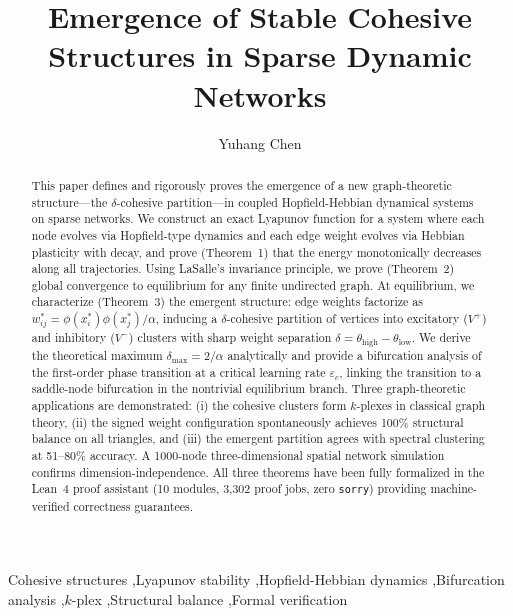 \documentclass[3p]{elsarticle}
\begin{document}
\begin{frontmatter}
\title{Emergence of Stable Cohesive Structures in Sparse Dynamic Networks}
\author[1]{Yuhang Chen}
\address[1]{Independent Researcher, Zhejiang, China}
\begin{abstract}

This paper defines and rigorously proves the emergence of a new graph-theoretic structure---the $\delta$-cohesive partition---in coupled Hopfield-Hebbian dynamical systems on sparse networks. We construct an exact Lyapunov function for a system where each node evolves via Hopfield-type dynamics and each edge weight evolves via Hebbian plasticity with decay, and prove (Theorem~1) that the energy monotonically decreases along all trajectories. Using LaSalle's invariance principle, we prove (Theorem~2) global convergence to equilibrium for any finite undirected graph. At equilibrium, we characterize (Theorem~3) the emergent structure: edge weights factorize as $w_{ij}^* = \phi(x_i^*)\phi(x_j^*)/\alpha$, inducing a $\delta$-cohesive partition of vertices into excitatory ($V^+$) and inhibitory ($V^-$) clusters with sharp weight separation $\delta = \theta_{\text{high}} - \theta_{\text{low}}$. We derive the theoretical maximum $\delta_{\max}=2/\alpha$ analytically and provide a bifurcation analysis of the first-order phase transition at a critical learning rate $\varepsilon_c$, linking the transition to a saddle-node bifurcation in the nontrivial equilibrium branch. Three graph-theoretic applications are demonstrated: (i) the cohesive clusters form $k$-plexes in classical graph theory, (ii) the signed weight configuration spontaneously achieves 100\% structural balance on all triangles, and (iii) the emergent partition agrees with spectral clustering at 51--80\% accuracy. A 1000-node three-dimensional spatial network simulation confirms dimension-independence. All three theorems have been fully formalized in the Lean~4 proof assistant (10 modules, 3,302 proof jobs, zero \texttt{sorry}) providing machine-verified correctness guarantees.

\end{abstract}

\begin{keyword}
Cohesive structures \sep Lyapunov stability \sep Hopfield-Hebbian dynamics \sep Bifurcation analysis \sep $k$-plex \sep Structural balance \sep Formal verification
\end{keyword}

\end{frontmatter}
\end{document}
